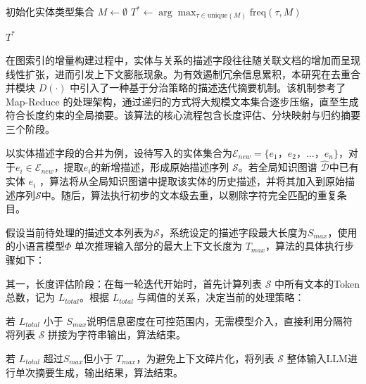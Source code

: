 \documentclass[promaster, vlined]{DissertUESTC}
\begin{document}
\begin{algorithm}[h]
    \SetAlgoLined
\caption{多数投票实体类型决策}
    \label{alg:vote}

    初始化实体类型集合 $M \gets \emptyset$\;
    $T^* \gets \arg \max_{\tau \in \mathrm{unique}(M)} \mathrm{freq}(\tau, M)$\;

    \Return $T^*$\;
\end{algorithm}


在图索引的增量构建过程中，实体与关系的描述字段往往随关联文档的增加而呈现线性扩张，进而引发上下文膨胀现象。为有效遏制冗余信息累积，本研究在去重合并模块 $D(\cdot)$ 中引入了一种基于分治策略的描述迭代摘要机制。该机制参考了 Map-Reduce 的处理架构，通过递归的方式将大规模文本集合逐步压缩，直至生成符合长度约束的全局摘要。该算法的核心流程包含长度评估、分块映射与归约摘要三个阶段。

以实体描述字段的合并为例，设待写入的实体集合为$\mathcal{E}_{new} = \{e_1， e_2， \dots， e_n\}$，对于$e_{i} \in \mathcal{E}_{new}$，提取$e_{i}$的新增描述，形成原始描述序列 $\mathcal{S}$。若全局知识图谱 $\hat{\mathcal{D}}$中已有实体 $e_{i}$ ，算法将从全局知识图谱中提取该实体的历史描述，并将其加入到原始描述序列$\mathcal{S}$中。随后，算法执行初步的文本级去重，以剔除字符完全匹配的重复条目。

假设当前待处理的描述文本列表为$\mathcal{S}$，系统设定的描述字段最大长度为$S_{max}$，使用的小语言模型$\Phi$ 单次推理输入部分的最大上下文长度为 $T_{max}$，算法的具体执行步骤如下：

其一，长度评估阶段：在每一轮迭代开始时，首先计算列表 $\mathcal{S}$ 中所有文本的Token总数，记为 $L_{total}$。根据 $L_{total}$ 与阈值的关系，决定当前的处理策略：

若 $L_{total}$ 小于 $S_{max}$说明信息密度在可控范围内，无需模型介入，直接利用分隔符将列表 $\mathcal{S}$ 拼接为字符串输出，算法结束。

若 $L_{total}$ 超过$S_{max}$但小于 $T_{max}$，为避免上下文碎片化，将列表 $\mathcal{S}$ 整体输入LLM进行单次摘要生成，输出结果，算法结束。
\end{document}
